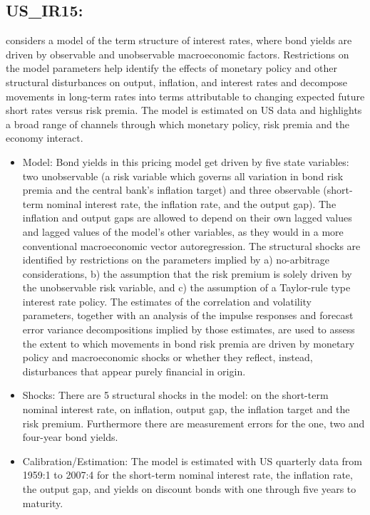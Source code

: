 \documentclass[11pt,a4paper]{article}
\begin{document}
	\subsection{US\_IR15: \cite{ireland2015monetary}}
	\label{USIR15}
	\cite{ireland2015monetary} considers a model of the term structure of interest rates, where bond yields are driven by observable and unobservable macroeconomic factors. Restrictions on the model parameters help identify the effects of monetary policy and other structural disturbances on output, inflation, and interest rates and decompose movements in long-term rates into terms attributable to changing expected future short rates versus risk premia. The model is estimated on US data and highlights a broad range of channels through which monetary policy, risk premia and the economy interact.
	\begin{itemize}
		\item Model: Bond yields in this pricing model get driven by five state variables: two unobservable (a risk variable which governs all variation in bond risk premia and the central bank's inflation target) and three observable (short-term nominal interest rate, the inflation rate, and the output gap). The inflation and output gaps are allowed to depend on their own lagged values and lagged values of the model's other variables, as they would in a more conventional macroeconomic vector autoregression. The structural shocks are identified by restrictions on the parameters implied by a) no-arbitrage considerations, b) the assumption that the risk premium is solely driven by the unobservable risk variable, and c) the assumption of a Taylor-rule type interest rate policy. The estimates of the correlation and volatility parameters, together with an analysis of the impulse responses and forecast error variance decompositions implied by those estimates, are used to assess the extent to which movements in bond risk premia are driven by monetary policy and macroeconomic shocks or whether they reflect, instead, disturbances that appear purely financial in origin.
		
		\item Shocks:  There are 5 structural shocks in the model: on the short-term nominal interest rate, on inflation, output gap, the inflation target and the risk premium. Furthermore there are measurement errors for the one, two and four-year bond yields. 
		\item Calibration/Estimation: The model is estimated with US quarterly data from 1959:1 to 2007:4 for the short-term nominal interest rate, the inflation rate, the output gap, and yields on discount bonds with one through five years to maturity.
		
	\end{itemize}
	
\end{document}
